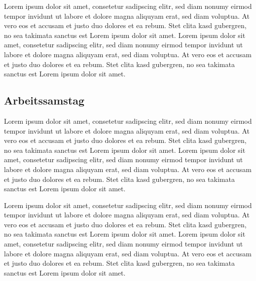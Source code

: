 \documentclass{berg}
\begin{document}
\begin{multicols}{2}
Lorem ipsum dolor sit amet, consetetur sadipscing elitr, sed diam nonumy eirmod tempor invidunt ut labore et dolore magna aliquyam erat, sed diam voluptua. At vero eos et accusam et justo duo dolores et ea rebum. Stet clita kasd gubergren, no sea takimata sanctus est Lorem ipsum dolor sit amet. Lorem ipsum dolor sit amet, consetetur sadipscing elitr, sed diam nonumy eirmod tempor invidunt ut labore et dolore magna aliquyam erat, sed diam voluptua. At vero eos et accusam et justo duo dolores et ea rebum. Stet clita kasd gubergren, no sea takimata sanctus est Lorem ipsum dolor sit amet.
 
\subsection{Arbeitssamstag}

Lorem ipsum dolor sit amet, consetetur sadipscing elitr, sed diam nonumy eirmod tempor invidunt ut labore et dolore magna aliquyam erat, sed diam voluptua. At vero eos et accusam et justo duo dolores et ea rebum. Stet clita kasd gubergren, no sea takimata sanctus est Lorem ipsum dolor sit amet. Lorem ipsum dolor sit amet, consetetur sadipscing elitr, sed diam nonumy eirmod tempor invidunt ut labore et dolore magna aliquyam erat, sed diam voluptua. At vero eos et accusam et justo duo dolores et ea rebum. Stet clita kasd gubergren, no sea takimata sanctus est Lorem ipsum dolor sit amet.

Lorem ipsum dolor sit amet, consetetur sadipscing elitr, sed diam nonumy eirmod tempor invidunt ut labore et dolore magna aliquyam erat, sed diam voluptua. At vero eos et accusam et justo duo dolores et ea rebum. Stet clita kasd gubergren, no sea takimata sanctus est Lorem ipsum dolor sit amet. Lorem ipsum dolor sit amet, consetetur sadipscing elitr, sed diam nonumy eirmod tempor invidunt ut labore et dolore magna aliquyam erat, sed diam voluptua. At vero eos et accusam et justo duo dolores et ea rebum. Stet clita kasd gubergren, no sea takimata sanctus est Lorem ipsum dolor sit amet.
 
\end{multicols}%
\end{document}
